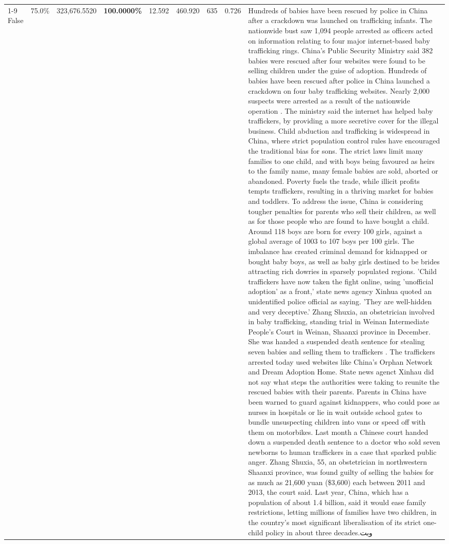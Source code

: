 \begin{table}[H]
\begin{tabular}{lllrlllll}
\cline{1-9}
False & 75.0\% & 323,676.5520 & \bfseries \color{red} 100.0000\% & 12.592 & 460.920 & 635 & 0.726 & Hundreds of babies have been rescued by police in China after a crackdown was launched on trafficking infants. The nationwide bust saw 1,094 people arrested as officers acted on information relating to four major internet-based baby trafficking rings. China's Public Security Ministry said 382 babies were rescued after four websites were found to be selling children under the guise of adoption. Hundreds of babies have been rescued after police in China launched a crackdown on four baby trafficking websites. Nearly 2,000 suspects were arrested as a result of the nationwide operation . The ministry said the internet has helped baby traffickers, by providing a more secretive cover for the illegal business. Child abduction and trafficking is widespread in China, where strict population control rules have encouraged the traditional bias for sons. The strict laws limit many families to one child, and with boys being favoured as heirs to the family name, many female babies are sold, aborted or abandoned. Poverty fuels the trade, while illicit profits tempts traffickers, resulting in a thriving market for babies and toddlers. To address the issue, China is considering tougher penalties for parents who sell their children, as well as for those people who are found to have bought a child. Around 118 boys are born for every 100 girls, against a global average of 1003 to 107 boys per 100 girls. The imbalance has created criminal demand for kidnapped or bought baby boys, as well as baby girls destined to be brides attracting rich dowries in sparsely populated regions. 'Child traffickers have now taken the fight online, using 'unofficial adoption' as a front,' state news agency Xinhua quoted an unidentified police official as saying. 'They are well-hidden and very deceptive.' Zhang Shuxia, an obstetrician involved in baby trafficking, standing trial in Weinan Intermediate People's Court in Weinan, Shaanxi province in December. She was handed a suspended death sentence for stealing seven babies and selling them to traffickers . The traffickers arrested today used websites like China's Orphan Network and Dream Adoption Home. State news agenct Xinhau did not say what steps the authorities were taking to reunite the rescued babies with their parents. Parents in China have been warned to guard against kidnappers, who could pose as nurses in hospitals or lie in wait outside school gates to bundle unsuspecting children into vans or speed off with them on motorbikes. Last month a Chinese court handed down a suspended death sentence to a doctor who sold seven newborns to human traffickers in a case that sparked public anger. Zhang Shuxia, 55, an obstetrician in northwestern Shaanxi province, was found guilty of selling the babies for as much as 21,600 yuan (\$3,600) each between 2011 and 2013, the court said. Last year, China, which has a population of about 1.4 billion, said it would ease family restrictions, letting millions of families have two children, in the country's most significant liberalisation of its strict one-child policy in about three decades.وبت \\

\end{tabular}
\end{table}
